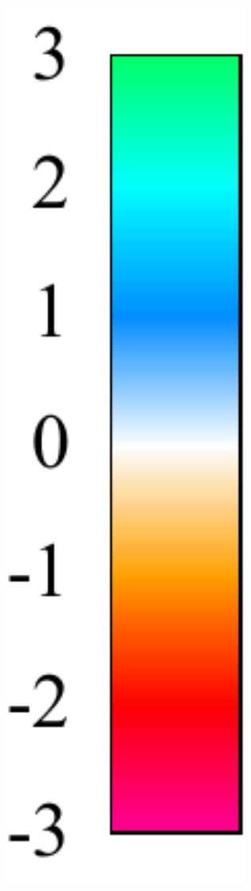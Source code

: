 \begin{center}
    \captionsetup{type=figure}
    \begin{minipage}{.07\textwidth}
        \centering
        \includegraphics[width=0.95\textwidth]{img/noise expr gradient.pdf}

\end{minipage}
\end{center}

